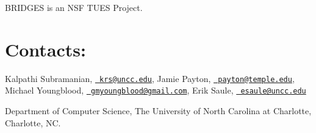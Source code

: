 B\+R\+I\+D\+G\+ES is an N\+SF T\+U\+ES Project.\hypertarget{index_contacts_sec}{}\section{Contacts\+:}\label{index_contacts_sec}
Kalpathi Subramanian, \href{mailto:krs@uncc.edu}{\texttt{ krs@uncc.\+edu}}, Jamie Payton, \href{mailto:payton@temple.edu}{\texttt{ payton@temple.\+edu}}, Michael Youngblood, \href{mailto:gmyoungblood@gmail.com}{\texttt{ gmyoungblood@gmail.\+com}}, Erik Saule, \href{mailto:esaule@uncc.edu}{\texttt{ esaule@uncc.\+edu}}

Department of Computer Science, The University of North Carolina at Charlotte, Charlotte, NC. 